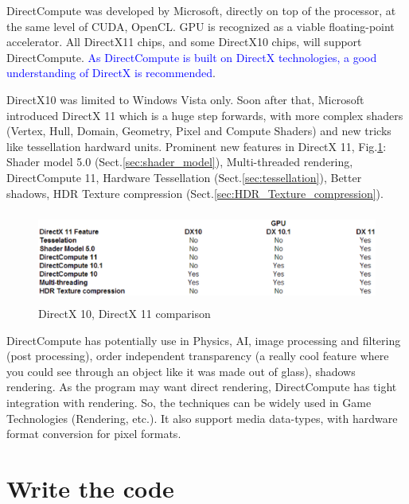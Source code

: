 DirectCompute was developed by Microsoft, directly on top of the processor, at
the same level of CUDA, OpenCL. GPU is recognized as a viable floating-point
accelerator. All DirectX11 chips, and some DirectX10 chips, will support
DirectCompute. \textcolor{blue}{As DirectCompute is built on DirectX
technologies, a good understanding of DirectX is recommended}.

DirectX10 was limited to Windows Vista only. Soon after that, Microsoft
introduced DirectX 11 which is a huge step forwards, with more complex shaders
(Vertex, Hull, Domain, Geometry, Pixel and Compute Shaders) and new tricks like
tessellation hardward units. Prominent new features in DirectX 11,
Fig.\ref{fig:DirectX_comparison}:
Shader model 5.0 (Sect.\ref{sec:shader_model}), Multi-threaded rendering,
DirectCompute 11, Hardware Tessellation (Sect.\ref{sec:tessellation}), Better
shadows, HDR Texture compression (Sect.\ref{sec:HDR_Texture_compression}).


\begin{figure}[hbt]
  \centerline{\includegraphics[height=3cm,
    angle=0]{./images/DirectX_comparison.eps}}
  \caption{DirectX 10, DirectX 11 comparison}
  \label{fig:DirectX_comparison}
\end{figure}

DirectCompute has potentially use in Physics, AI, image processing and filtering
(post processing), order independent transparency (a really cool feature where
you could see through an object like it was made out of glass), shadows
rendering. As the program may want direct rendering, DirectCompute has tight
integration with rendering. So, the techniques can be widely used in Game
Technologies (Rendering, etc.). It also support media data-types, with hardware
format conversion for pixel formats.


\section{Write the code}

